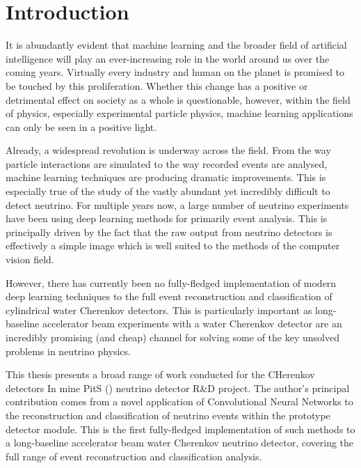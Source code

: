 \chapter{Introduction} %
\label{chap:introduction} %
\setcounter{page}{17}  %

It is abundantly evident that machine learning and the broader field of artificial intelligence
will play an ever-increasing role in the world around us over the coming years. Virtually every
industry and human on the planet is promised to be touched by this proliferation. Whether this
change has a positive or detrimental effect on society as a whole is questionable, however, within
the field of physics, especially experimental particle physics, machine learning applications can
only be seen in a positive light.

Already, a widespread revolution is underway across the field. From the way particle interactions
are simulated to the way recorded events are analysed, machine learning techniques are producing
dramatic improvements. This is especially true of the study of the vastly abundant yet incredibly
difficult to detect neutrino. For multiple years now, a large number of neutrino experiments have
been using deep learning methods for primarily event analysis. This is principally driven by the
fact that the raw output from neutrino detectors is effectively a simple image which is well
suited to the methods of the computer vision field.

However, there has currently been no fully-fledged implementation of modern deep learning
techniques to the full event reconstruction and classification of cylindrical water Cherenkov
detectors. This is particularly important as long-baseline accelerator beam experiments with a
water Cherenkov detector are an incredibly promising (and cheap) channel for solving some of the
key unsolved problems in neutrino physics.

This thesis presents a broad range of work conducted for the CHerenkov detectors In mine PitS
(\chips) neutrino detector R\&D project. The author's principal contribution comes from a novel
application of Convolutional Neural Networks to the reconstruction and classification of neutrino
events within the \chipsfive prototype detector module. This is the first fully-fledged
implementation of such methods to a long-baseline accelerator beam water Cherenkov neutrino
detector, covering the full range of event reconstruction and classification analysis. 

